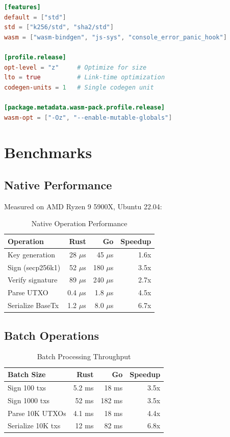 \documentclass[11pt,twocolumn]{article}
\begin{document}
\begin{lstlisting}[language=TOML,caption=Cargo.toml Features]
[features]
default = ["std"]
std = ["k256/std", "sha2/std"]
wasm = ["wasm-bindgen", "js-sys", "console_error_panic_hook"]

[profile.release]
opt-level = "z"     # Optimize for size
lto = true          # Link-time optimization
codegen-units = 1   # Single codegen unit

[package.metadata.wasm-pack.profile.release]
wasm-opt = ["-Oz", "--enable-mutable-globals"]
\end{lstlisting}

\section{Benchmarks}

\subsection{Native Performance}

Measured on AMD Ryzen 9 5900X, Ubuntu 22.04:

\begin{table}[h]
\centering
\caption{Native Operation Performance}
\begin{tabular}{lrrr}
\toprule
\textbf{Operation} & \textbf{Rust} & \textbf{Go} & \textbf{Speedup} \\
\midrule
Key generation & 28 $\mu$s & 45 $\mu$s & 1.6x \\
Sign (secp256k1) & 52 $\mu$s & 180 $\mu$s & 3.5x \\
Verify signature & 89 $\mu$s & 240 $\mu$s & 2.7x \\
Parse UTXO & 0.4 $\mu$s & 1.8 $\mu$s & 4.5x \\
Serialize BaseTx & 1.2 $\mu$s & 8.0 $\mu$s & 6.7x \\
\bottomrule
\end{tabular}
\end{table}

\subsection{Batch Operations}

\begin{table}[h]
\centering
\caption{Batch Processing Throughput}
\begin{tabular}{lrrr}
\toprule
\textbf{Batch Size} & \textbf{Rust} & \textbf{Go} & \textbf{Speedup} \\
\midrule
Sign 100 txs & 5.2 ms & 18 ms & 3.5x \\
Sign 1000 txs & 52 ms & 182 ms & 3.5x \\
Parse 10K UTXOs & 4.1 ms & 18 ms & 4.4x \\
Serialize 10K txs & 12 ms & 82 ms & 6.8x \\
\bottomrule
\end{tabular}
\end{table}
\end{document}
